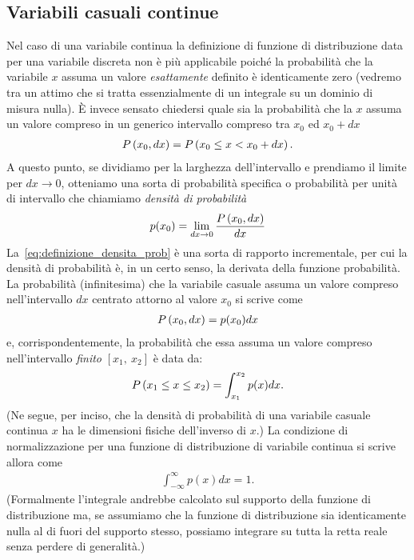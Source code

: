 \subsection{Variabili casuali continue}

Nel caso di una variabile continua la definizione di funzione di distribuzione
data per una variabile discreta non è più applicabile poiché la
probabilità che la variabile $x$ assuma un valore \emph{esattamente} definito
è identicamente zero (vedremo tra un attimo che si tratta essenzialmente
di un integrale su un dominio di misura nulla).
\`E invece sensato chiedersi quale sia la probabilità che la $x$ assuma
un valore compreso in un generico intervallo compreso tra $x_0$ ed $x_0 + dx$
\begin{align*}
  \displaystyle P\left(x_0, dx\right) = \displaystyle P\left(x_0 \leq x < x_0 + dx\right).
\end{align*}
A questo punto, se dividiamo per la larghezza dell'intervallo e prendiamo il
limite per $dx \rightarrow 0$, otteniamo una sorta di probabilità
specifica o probabilità per unità di intervallo che chiamiamo
\emph{densità di probabilità}
\begin{align}\label{eq:definizione_densita_prob}
  p(x_0) = \lim_{dx \rightarrow 0} \frac{\displaystyle P\left(x_0, dx\right)}{dx}
\end{align}
La~\eqref{eq:definizione_densita_prob} è una sorta di rapporto incrementale,
per cui la densità di probabilità è, in un certo senso, la derivata
della funzione probabilità. La probabilità (infinitesima) che la variabile
casuale assuma un valore compreso nell'intervallo $dx$ centrato attorno al
valore $x_0$ si scrive come
\begin{align*}
  \displaystyle P\left(x_0, dx\right) = p(x_0) dx
\end{align*}
e, corrispondentemente, la probabilità che essa assuma un valore compreso
nell'intervallo \emph{finito} $[x_1,~x_2]$ è data da:
\begin{align}
  \displaystyle P\left(x_1 \leq x \leq x_2\right) = \int_{x_1}^{x_2} p(x)dx.
\end{align}
(Ne segue, per inciso, che la densità di probabilità di una variabile
casuale continua $x$ ha le dimensioni fisiche dell'inverso di $x$.)
La condizione di normalizzazione per una funzione di distribuzione di
variabile continua si scrive allora come
\begin{align}\label{eq:normalizzazione_pdf}
  \int_{-\infty}^{\infty} p(x)dx = 1.
\end{align}
(Formalmente l'integrale andrebbe calcolato sul supporto della funzione di
distribuzione ma, se assumiamo che la funzione di distribuzione sia
identicamente nulla al di fuori del supporto stesso, possiamo integrare su
tutta la retta reale senza perdere di generalità.)

